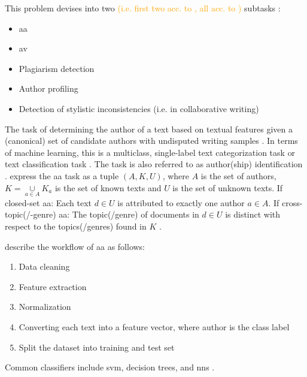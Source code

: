 \begin{definition}
    This problem devises into two \textcolor{orange}{(i.e. first two acc. to \cite{stein_intrinsic_2011}, all acc. to \cite{stamatatos_survey_2009})} subtasks \cite{stein_intrinsic_2011}:
    \begin{itemize}
        \item \ac{aa} \cite{stein_intrinsic_2011}
        \item \ac{av} \cite{stein_intrinsic_2011,stamatatos_survey_2009}
        \item Plagiarism detection \cite{stamatatos_survey_2009}
        \item Author profiling \cite{stamatatos_survey_2009}
        \item Detection of stylistic inconsistencies (i.e. in collaborative writing) \cite{stamatatos_survey_2009}
    \end{itemize}
\end{definition}

\begin{definition}
    [\ac{aa}]   %
    The task of determining the author of a text based on textual features 
    given a (canonical) set of candidate authors with undisputed writing samples 
    \cite{stein_intrinsic_2011,stamatatos_survey_2009,tyo_state_2022,bischoff_importance_2020,barlas_cross_domain_2020,altakrori_topic_2021,bevendorff_divergence_based_2020,elmanarelbouanani_authorship_2014,abbasi_writeprints_2008}.
    In terms of machine learning, this is a multiclass, single-label text categorization task \cite{stamatatos_survey_2009,elmanarelbouanani_authorship_2014} or text classification task \cite{elmanarelbouanani_authorship_2014}.
    The task is also referred to as author(ship) identification \cite{stamatatos_survey_2009,elmanarelbouanani_authorship_2014}.
    \citet{barlas_cross_domain_2020} express the \ac{aa} task as a tuple $(A,K,U)$, 
    where $A$ is the set of authors, $K=\underset{a\in A}{\cup}K_a$ is the set of known texts and $U$ is the set of unknown texts.
    If closed-set \ac{aa}: Each text $d \in U$ is attributed to exactly one author $a \in A$.
    If cross-topic(/-genre) \ac{aa}: The topic(/genre) of documents in $d \in U$ is distinct 
    with respect to the topics(/genres) found in $K$ \cite{barlas_cross_domain_2020}. 
\end{definition}

\citet{elmanarelbouanani_authorship_2014} describe the workflow of \ac{aa} as follows:
\begin{enumerate}
    \item Data cleaning
    \item Feature extraction
    \item Normalization
    \item Converting each text into a feature vector, where author is the class label
    \item Split the dataset into training and test set
\end{enumerate}
Common classifiers include \ac{svm}, decision trees, and \acp{nn} \cite{elmanarelbouanani_authorship_2014}.


